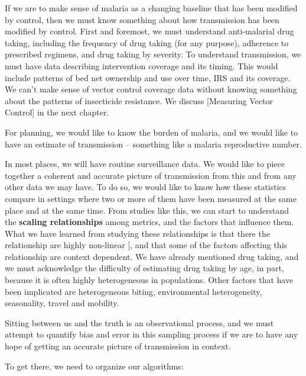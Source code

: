 \documentclass[
]{book}
\begin{document}
If we are to make sense of malaria as a changing baseline that has been modified by control, then we must know something about how transmission has been modified by control. First and foremost, we must understand anti-malarial drug taking, including the frequency of drug taking (for any purpose), adherence to prescribed regimens, and drug taking by severity. To understand transmission, we must have data describing intervention coverage and its timing. This would include patterns of bed net ownership and use over time, IRS and its coverage. We can't make sense of vector control coverage data without knowing something about the patterns of insecticide resistance. We discuss {[}Measuring Vector Control{]} in the next chapter.

For planning, we would like to know the burden of malaria, and we would like to have an estimate of transmission -- something like a malaria reproductive number.

In most places, we will have routine surveillance data. We would like to piece together a coherent and accurate picture of transmission from this and from any other data we may have. To do so, we would like to know how these statistics compare in settings where two or more of them have been measured at the same place and at the same time. From studies like this, we can start to understand the \textbf{scaling relationships} among metrics, and the factors that influence them. What we have learned from studying these relationships is that there the relationship are highly non-linear {[}\citeproc{ref-HaySI2008MeasuringMalaria}{78}{]}, and that some of the factors affecting this relationship are context dependent. We have already mentioned drug taking, and we must acknowledge the difficulty of estimating drug taking by age, in part, because it is often highly heterogeneous in populations. Other factors that have been implicated are heterogeneous biting, environmental heterogeneity, seasonality, travel and mobility.

Sitting between us and the truth is an observational process, and we must attempt to quantify bias and error in this sampling process if we are to have any hope of getting an accurate picture of transmission in context.

To get there, we need to organize our algorithms:
\end{document}
